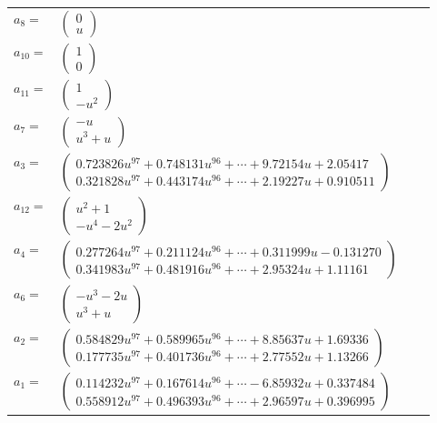 \documentclass[1p]{elsarticle_modified}
\theoremstyle{definition}
\begin{document}
\begin{tabular}{m{7pt} m{180pt} m{7pt} m{180pt} }
\flushright $a_{8}=$&$\begin{pmatrix}0\\u\end{pmatrix}$ \\
\flushright $a_{10}=$&$\begin{pmatrix}1\\0\end{pmatrix}$ \\
\flushright $a_{11}=$&$\begin{pmatrix}1\\- u^2\end{pmatrix}$ \\
\flushright $a_{7}=$&$\begin{pmatrix}- u\\u^3+u\end{pmatrix}$ \\
\flushright $a_{3}=$&$\begin{pmatrix}0.723826 u^{97}+0.748131 u^{96}+\cdots+9.72154 u+2.05417\\0.321828 u^{97}+0.443174 u^{96}+\cdots+2.19227 u+0.910511\end{pmatrix}$ \\
\flushright $a_{12}=$&$\begin{pmatrix}u^2+1\\- u^4-2 u^2\end{pmatrix}$ \\
\flushright $a_{4}=$&$\begin{pmatrix}0.277264 u^{97}+0.211124 u^{96}+\cdots+0.311999 u-0.131270\\0.341983 u^{97}+0.481916 u^{96}+\cdots+2.95324 u+1.11161\end{pmatrix}$ \\
\flushright $a_{6}=$&$\begin{pmatrix}- u^3-2 u\\u^3+u\end{pmatrix}$ \\
\flushright $a_{2}=$&$\begin{pmatrix}0.584829 u^{97}+0.589965 u^{96}+\cdots+8.85637 u+1.69336\\0.177735 u^{97}+0.401736 u^{96}+\cdots+2.77552 u+1.13266\end{pmatrix}$ \\
\flushright $a_{1}=$&$\begin{pmatrix}0.114232 u^{97}+0.167614 u^{96}+\cdots-6.85932 u+0.337484\\0.558912 u^{97}+0.496393 u^{96}+\cdots+2.96597 u+0.396995\end{pmatrix}$ \\

\end{tabular}
\end{document}
